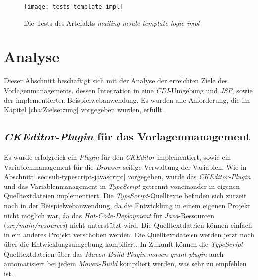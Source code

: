 \begin{figure}[h]
\centering
\texttt{[image: tests-template-impl]}
\caption{Die Tests des Artefakts \emph{mailing-moule-template-logic-impl}}
\label{fig:tests-template-impl}
\end{figure}

\section{Analyse}
Dieser Abschnitt beschäftigt sich mit der Analyse der erreichten Ziele des Vorlagenmanagements, dessen Integration in eine \emph{CDI}-Umgebung und \emph{JSF}, sowie der implementierten Beispielwebanwendung. Es wurden alle Anforderung, die im Kapitel \ref{cha:Zielsetzung} vorgegeben wurden, erfüllt.

\subsection{\emph{CKEditor-Plugin} für das Vorlagenmanagement}
Es wurde erfolgreich ein \emph{Plugin} für den \emph{CKEditor} implementiert, sowie ein Variablenmanagement für die \emph{Browser}-seitige Verwaltung der Variablen. Wie in Abschnitt \ref{sec:sub-typescript-javascript} vorgegeben, wurde das \emph{CKEditor-Plugin} und das Variablenmanagement in \emph{TypeScript} getrennt voneinander in eigenen Quelltextdateien implementiert. Die \emph{TypeScript}-Quelltexte befinden sich zurzeit noch in der Beispielwebanwendung, da die Entwicklung in einem eigenen Projekt nicht möglich war, da das \emph{Hot-Code-Deployment} für \emph{Java}-Ressourcen (\emph{src/main/resources}) nicht unterstützt wird. Die Quelltextdateien können einfach in ein anderes Projekt verschoben werden. Die Quelltextdateien werden jetzt noch über die Entwicklungsumgebung kompiliert. In Zukunft können die \emph{TypeScript}-Quelltextdateien über das \emph{Maven-Build-Plugin maven-grunt-plugin} auch automatisiert bei jedem \emph{Maven-Build} kompiliert werden, was sehr zu empfehlen ist.

